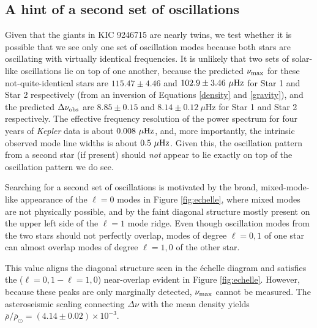 \subsection{A hint of a second set of oscillations}
\label{subsec_second_osc}
Given that the giants in KIC 9246715 are nearly twins, we test whether it is possible that we see only one set of oscillation modes because both stars are oscillating with virtually identical frequencies. It is unlikely that two sets of solar-like oscillations lie on top of one another, because the predicted $\nu_{\rm{max}}$ for these not-quite-identical stars are $115.47 \pm 4.46$ and $102.9 \pm 3.46\ \mu\rm{Hz}$ for Star 1 and Star 2 respectively (from an inversion of Equations \ref{density} and \ref{gravity}), and the predicted $\Delta\nu_{\rm{obs}}$ are $8.85 \pm 0.15$ and $8.14 \pm 0.12 \ \mu$Hz for Star 1 and Star 2 respectively. The effective frequency resolution of the power spectrum for four years of \emph{Kepler} data is about $0.008 \ \mu \rm{Hz}$, and, more importantly, the intrinsic observed mode line widths is about $0.5 \ \mu \rm{Hz}$. Given this, the oscillation pattern from a second star (if present) should \emph{not} appear to lie exactly on top of the oscillation pattern we do see.

Searching for a second set of oscillations is motivated by the broad, mixed-mode-like appearance of the $\ell=0$ modes in Figure \ref{fig:echelle}, where mixed modes are not physically possible, and by the faint diagonal structure mostly present on the upper left side of the $\ell=1$ mode ridge. Even though oscillation modes from the two stars should not perfectly overlap, modes of degree $\ell=0,1$ of one star can almost overlap modes of degree $\ell=1,0$ of the other star.


This value aligns the diagonal structure seen in the \'echelle diagram and satisfies the ($\ell=0,1-\ell=1,0$) near-overlap evident in Figure \ref{fig:echelle}. However, because these peaks are only marginally detected, $\nu_{\rm{max}}$ cannot be measured. The asteroseismic scaling connecting $\Delta\nu$ with the mean density yields $\bar{\rho}/\bar{\rho}_\odot = (4.14 \pm 0.02)\times 10^{-3}$. 

